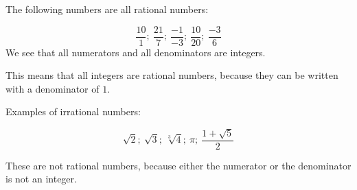 The following numbers are all rational numbers:\par 


\begin{equation*}
\frac{10}{1};~\frac{21}{7};~\frac{-1}{-3};~\frac{10}{20};~\frac{-3}{6}
\end{equation*}
We see that all numerators and all denominators are integers.

This means that all integers are rational numbers, because they can be
written with a denominator of $1$.\\






Examples of irrational numbers:\par 

\begin{equation*}
  \sqrt{2};~\sqrt{3};~\sqrt[3]{4};~\pi;~\frac{1+\sqrt{5}}{2}
\end{equation*}

These are not rational numbers, because either the numerator or the denominator is not an integer.\par 



